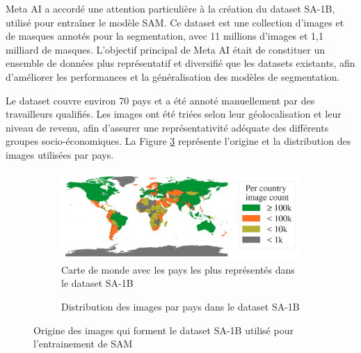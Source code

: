 Meta AI a accordé une attention particulière à la création du dataset SA-1B, utilisé pour entraîner le modèle SAM. Ce dataset est une collection d'images et de masques annotés pour la segmentation, avec 11 millions d'images et 1,1 milliard de masques. L'objectif principal de Meta AI était de constituer un ensemble de données plus représentatif et diversifié que les datasets existants, afin d'améliorer les performances et la généralisation des modèles de segmentation.

Le dataset couvre environ 70 pays et a été annoté manuellement par des travailleurs qualifiés. Les images ont été triées selon leur géolocalisation et leur niveau de revenu, afin d'assurer une représentativité adéquate des différents groupes socio-économiques. La Figure \ref{fig:ch2_sam2_sa1b_diversite_pays} représente l’origine et la distribution des images utilisées par pays.

\begin{figure}[H]
    \centering
    \begin{subfigure}[b]{0.70\textwidth}
        \centering
        \includegraphics[width=\textwidth]{02-main/figures/ch2/ch2_sam2_06_dataset_sa1b_pays1.png}
        \caption{Carte de monde avec les pays les plus représentés dans le dataset SA-1B}
        \label{fig:ch2_sam2_06_dataset_sa1b_pays1}
    \end{subfigure}
    \vspace{0.35cm}
    \begin{subfigure}[b]{1\textwidth}
        \centering
        \caption{Distribution des images par pays dans le dataset SA-1B}
        \label{fig:ch2_sam2_07_dataset_sa1b_pays2}
    \end{subfigure}
    \caption{Origine des images qui forment le dataset SA-1B utilisé pour l’entrainement de SAM \cite{kirillov_segment_2023}}
    \label{fig:ch2_sam2_sa1b_diversite_pays}
\end{figure}

